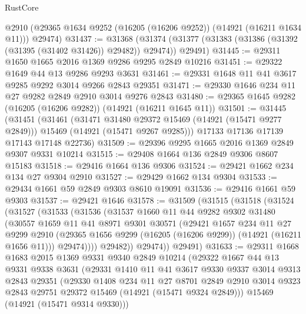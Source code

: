 \begin{lexlean}{RustCore}
\begin{coremodule}
      @2910
      (@29365 @1634 @9252 (@16205 (@16206 @9252)) (@14921 (@16211 @1634 @11)))
      @29474)
@31437 := @31368
    (@31374 (@31377 (@31383 (@31386 (@31392 (@31395 (@31402 @31426)) @29482)) @29474)) @29491)
@31445 := @29311 @1650 @1665 @2016 @1369 @9286 @9295 @2849 @10216
@31451 := @29322 @1649 @44 @13 @9286 @9293 @3631
@31461 := @29331 @1648 @11 @41 @3617 @9285 @9292 @3014 @9266 @2843 @29351
@31471 := @29330 @1646 @234 @11 @27 @9282 @2849 @2910 @3014 @9276 @2843
@31480 := @29365 @1645 @9282 (@16205 (@16206 @9282)) (@14921 (@16211 @1645 @11))
@31501 := @31445
    (@31451
      (@31461
        (@31471 @31480 @29372 @15469 (@14921 (@15471 @9277 @2849)))
        @15469
        (@14921 (@15471 @9267 @9285)))
      @17133
      @17136
      @17139
      @17143
      @17148
      @22736)
@31509 := @29396 @9295 @1665 @2016 @1369 @2849 @9307 @9331 @10214
@31515 := @29408 @1664 @136 @2849 @9306 @8607 @15183
@31518 := @29416 @1664 @136 @9306
@31524 := @29421 @1662 @234 @134 @27 @9304 @2910
@31527 := @29429 @1662 @134 @9304
@31533 := @29434 @1661 @59 @2849 @9303 @8610 @19091
@31536 := @29416 @1661 @59 @9303
@31537 := @29421 @1646
@31578 := @31509
    (@31515
      (@31518
        (@31524
          (@31527
            (@31533
              (@31536
                (@31537
                  @1660
                  @11
                  @44
                  @9282
                  @9302
                  @31480
                  (@30557
                    @1659
                    @11
                    @41
                    @8971
                    @9301
                    @30571
                    (@29421
                      @1657
                      @234
                      @11
                      @27
                      @9299
                      @2910
                      (@29365 @1656 @9299 (@16205 (@16206 @9299)) (@14921 (@16211 @1656 @11)))
                      @29474))))
              @29482))
          @29474))
      @29491)
@31633 := @29311
    @1668
    @1683
    @2015
    @1369
    @9331
    @9340
    @2849
    @10214
    (@29322
      @1667
      @44
      @13
      @9331
      @9338
      @3631
      (@29331
        @1410
        @11
        @41
        @3617
        @9330
        @9337
        @3014
        @9313
        @2843
        @29351
        (@29330
          @1408
          @234
          @11
          @27
          @8701
          @2849
          @2910
          @3014
          @9323
          @2843
          @29751
          @29372
          @15469
          (@14921 (@15471 @9324 @2849)))
        @15469
        (@14921 (@15471 @9314 @9330)))

\end{coremodule}
\end{lexlean}
